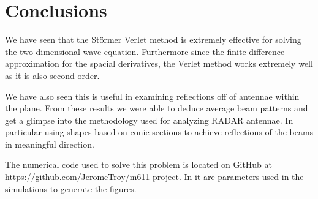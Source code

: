 \documentclass{article}
\begin{document}
\section{Conclusions}

We have seen that the St\"ormer Verlet method is extremely effective for
solving the two dimensional wave equation.  Furthermore since the
finite difference approximation for the spacial derivatives, the Verlet method
works extremely well as it is also second order.

We have also seen this is
useful in examining reflections off of antennae within the plane.
From these results we were able to deduce average beam patterns and get a
glimpse into the methodology used for analyzing RADAR antennae.  In particular
using shapes based on conic sections to achieve reflections of the beams
in meaningful direction.

\newpage




The numerical code used to solve this problem is located on GitHub at
\url{https://github.com/JeromeTroy/m611-project}.
In it are parameters used in the simulations to generate the figures.
\end{document}
